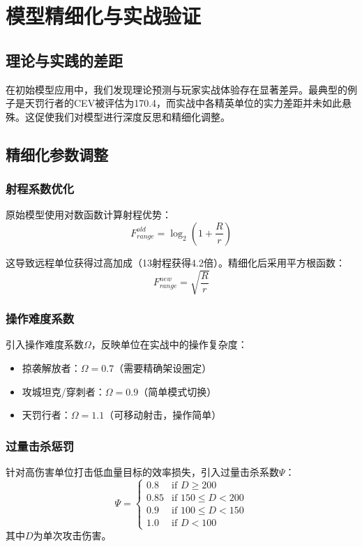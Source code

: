 \documentclass[a4paper,12pt]{article}
\begin{document}
\section{模型精细化与实战验证}

\subsection{理论与实践的差距}
在初始模型应用中，我们发现理论预测与玩家实战体验存在显著差异。最典型的例子是天罚行者的CEV被评估为170.4，而实战中各精英单位的实力差距并未如此悬殊。这促使我们对模型进行深度反思和精细化调整。

\subsection{精细化参数调整}

\subsubsection{射程系数优化}
原始模型使用对数函数计算射程优势：
\begin{equation}
F_{range}^{old} = \log_2(1 + \frac{R}{r})
\end{equation}

这导致远程单位获得过高加成（13射程获得4.2倍）。精细化后采用平方根函数：
\begin{equation}
F_{range}^{new} = \sqrt{\frac{R}{r}}
\end{equation}

\subsubsection{操作难度系数}
引入操作难度系数$\Omega$，反映单位在实战中的操作复杂度：
\begin{itemize}
\item 掠袭解放者：$\Omega = 0.7$（需要精确架设圈定）
\item 攻城坦克/穿刺者：$\Omega = 0.9$（简单模式切换）
\item 天罚行者：$\Omega = 1.1$（可移动射击，操作简单）
\end{itemize}

\subsubsection{过量击杀惩罚}
针对高伤害单位打击低血量目标的效率损失，引入过量击杀系数$\Psi$：
\begin{equation}
\Psi = \begin{cases}
0.8 & \text{if } D \geq 200 \\
0.85 & \text{if } 150 \leq D < 200 \\
0.9 & \text{if } 100 \leq D < 150 \\
1.0 & \text{if } D < 100
\end{cases}
\end{equation}
其中$D$为单次攻击伤害。
\end{document}
